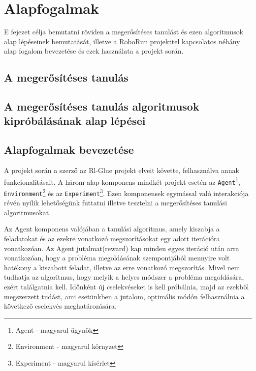 \chapter{Alapfogalmak}\label{ch:ALAPFOGALMAK}

\begin{osszefoglal}
	E fejezet célja bemutatni röviden a megerősítéses tanulást és ezen algoritmusok alap lépéseinek bemutatását, illetve a RoboRun projekttel kapcsolatos néhány alap fogalom bevezetése és ezek használata a projekt során.
\end{osszefoglal}

\section{A megerősítéses tanulás}\label{sec:MEGEROSITESESTANULAS}


\section{A megerősítéses tanulás algoritmusok kipróbálásának alap lépései}\label{sec:MEGEROSITESESALOGRITMUSOK}


\section{Alapfogalmak bevezetése}\label{sec:ALAPFOGALMAK}

A projekt során a szerző az Rl-Glue projekt elveit követte, felhasználva annak funkcionalitásait. A három alap komponens mindkét projekt esetén  az \texttt{Agent}\footnote{Agent - magyarul ügynök}, \texttt{Environment}\footnote{Environment - magyarul környzet} és az \texttt{Experiment}\footnote{Experiment - magyarul  kísérlet}. Ezen komponensek egymással való interakciója révén nyílik lehetőségünk futtatni illetve tesztelni a megerősítéses tanulási algoritmusokat. 

	Az Agent komponens valójában a tanulási algoritmus, amely kiszabja a feladatokat és az ezekre vonatkozó megszorításokat egy adott iterációra vonatkozóan. Az Agent jutalmat(reward) kap minden egyes iteráció után arra vonatkozóan, hogy a probléma megoldásának szempontjából mennyire volt hatékony a kiszabott feladat, illetve az erre vonatkozó megszorítás. Mivel nem tudhatja az algoritmus, hogy melyik a helyes módszer a probléma megoldására, ezért találgatnia kell. Időnként új cselekvéseket is kell próbálnia, majd az ezekből megszerzett tudást, ami esetünkben a jutalom, optimális módón felhasználnia a következő cselekvés meghatározására. 
	
